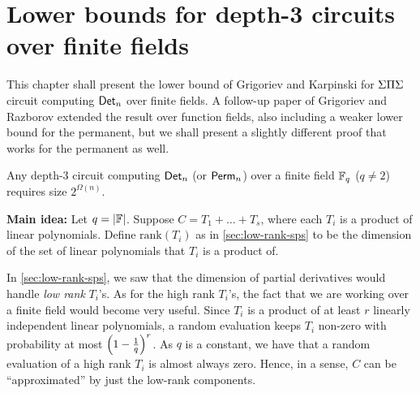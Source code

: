 \chapter{Lower bounds for depth-3 circuits over finite fields}\label{chap:GK}

This chapter shall present the lower bound of Grigoriev and Karpinski \cite{grigoriev98} for $\Sigma\Pi\Sigma$ circuit computing $\mathsf{Det}_n$ over finite fields. A follow-up paper of Grigoriev and Razborov \cite{gr00} extended the result over function fields, also including a weaker lower bound for the permanent, but we shall present a slightly different proof that works for the permanent as well.

\begin{theorem}\cite{grigoriev98}\label{thm:gk-main-thm}
  Any depth-3 circuit computing $\mathsf{Det}_n$ (or $\mathsf{Perm}_n$) over a finite field $\mathbb{F}_q$ ($q\neq 2$) requires size $2^{\Omega(n)}$.
\end{theorem}

{\bf Main idea:} Let $q = |\mathbb{F}|$. Suppose $C = T_1 + \dots + T_s$, where each $T_i$ is a product of linear polynomials. Define $\mathrm{rank}(T_i)$ as in \autoref{sec:low-rank-sps} to be the dimension of the set of linear polynomials that $T_i$ is a product of.

In \autoref{sec:low-rank-sps}, we saw that the dimension of partial derivatives would handle \emph{low rank} $T_i$'s. As for the high rank $T_i$'s, the fact that we are working over a finite field would become very useful. Since $T_i$ is a product of at least $r$ linearly independent linear polynomials, a random evaluation keeps $T_i$ non-zero with probability at most $\left(1-\frac{1}{q}\right)^r$. As $q$ is a constant, we have that a random evaluation of a high rank $T_i$ is almost always zero. Hence, in a sense, $C$ can be ``approximated'' by just the low-rank components.


